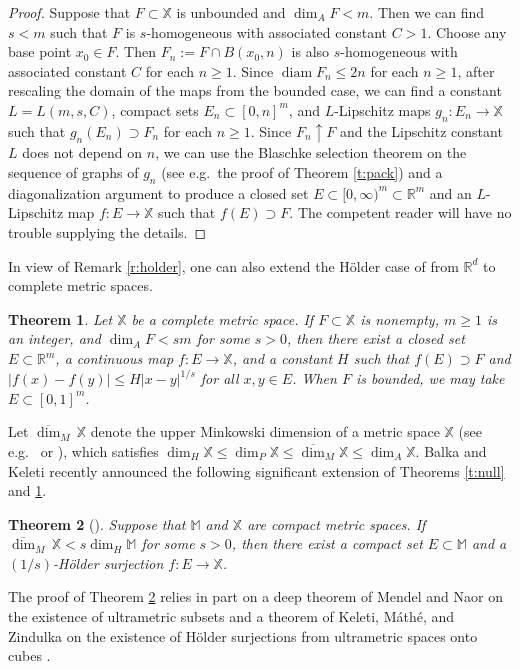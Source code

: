 \documentclass[12pt]{amsart}
\newtheorem{theorem}{Theorem}[section]
\theoremstyle{definition}
\theoremstyle{remark}
\newcommand{\RR}{\mathbb{R}}
\newcommand{\MM}{\mathbb{M}}
\newcommand{\XX}{\mathbb{X}}
\newcommand{\diam}{\mathop\mathrm{diam}\nolimits}
\numberwithin{figure}{section}
\numberwithin{equation}{section}
\begin{document}
\begin{proof}
Suppose that $F\subset\XX$ is unbounded and $\dim_A F<m$. Then we can find $s<m$ such that $F$ is $s$-homogeneous with associated constant $C>1$. Choose any base point $x_0\in F$. Then $F_n:=F\cap B(x_0,n)$ is also $s$-homogeneous with associated constant $C$ for each $n\geq 1$. Since $\diam F_n\leq 2n$ for each $n\geq 1$, after rescaling the domain of the maps from the bounded case, we can find a constant $L=L(m,s,C)$, compact sets $E_n\subset[0,n]^m$, and $L$-Lipschitz maps $g_n:E_n\rightarrow\XX$ such that $g_n(E_n)\supset F_n$ for each $n\geq 1$. Since $F_n\uparrow F$ and the Lipschitz constant $L$ does not depend on $n$, we can use the Blaschke selection theorem on the sequence of graphs of $g_n$ (see e.g.~the proof of Theorem \ref{t:pack}) and a diagonalization argument to produce a closed set $E\subset[0,\infty)^m\subset\RR^m$ and an $L$-Lipschitz map $f:E\rightarrow\XX$ such that $f(E)\supset F$. The competent reader will have no trouble supplying the details.
\end{proof}

In view of Remark \ref{r:holder}, one can also extend the H\"older case of \cite[Theorem 3.2]{BV} from $\RR^d$ to complete metric spaces.

\begin{theorem}\label{t:null-holder} Let $\XX$ be a complete metric space. If $F\subset\XX$ is nonempty, $m\geq 1$ is an integer, and $\dim_A F<sm$ for some $s>0$, then there exist a closed set $E\subset\RR^m$, a continuous map $f:E\rightarrow\XX$, and a constant $H$ such that $f(E)\supset F$ and $|f(x)-f(y)|\leq H|x-y|^{1/s}$ for all $x,y\in E$. When $F$ is bounded, we may take $E\subset[0,1]^m$.\end{theorem}

Let $\overline{\dim}_M\, \XX$ denote the upper Minkowski dimension of a metric space $\XX$ (see e.g.~\cite{Mattila} or \cite{bishop-peres}), which satisfies $\dim_H \XX\leq \dim_P \XX\leq \overline{\dim}_M \XX\leq \dim_A \XX$. Balka and Keleti recently announced the following significant extension of Theorems \ref{t:null} and \ref{t:null-holder}.

\begin{theorem}[{\cite[Theorem 4.3]{balka-keleti}}] \label{t:bk} Suppose that $\MM$ and $\XX$ are compact metric spaces. If $\overline{\dim}_M\, \XX<s \dim_H \MM$ for some $s>0$, then there exist a compact set $E\subset\MM$ and a $(1/s)$-H\"older surjection $f:E\rightarrow \XX$.\end{theorem}

The proof of Theorem \ref{t:bk} relies in part on a deep theorem of Mendel and Naor  on the existence of ultrametric subsets \cite{mendel-naor} and a theorem of Keleti, M\'ath\'e, and Zindulka on the existence of H\"older surjections from ultrametric spaces onto cubes \cite{KMZ}.
\end{document}
